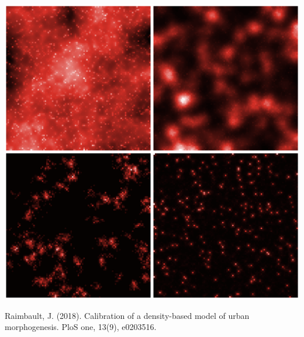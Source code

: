 \documentclass[english,11pt]{beamer}
\begin{document}
{\begin{columns}
\begin{column}{0.5\textwidth}
		\includegraphics[width=\textwidth]{figures/mesogrowth.png}
		
		\footnotesize
		\justify
		Raimbault, J. (2018). Calibration of a density-based model of urban morphogenesis. PloS one, 13(9), e0203516.
		\nocite{raimbault2018calibration}
	\end{column}
\end{columns}



}
\end{document}
